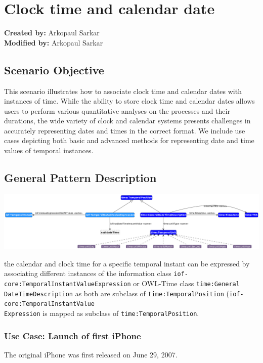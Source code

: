 \section{Clock time and calendar date}
\label{sec-clock-calendar}

\textbf{Created by:} Arkopaul Sarkar \\
\textbf{Modified by:} Arkopaul Sarkar \\

\subsection*{Scenario Objective}

This scenario illustrates how to associate clock time and calendar dates with instances of time. While the ability to store clock time and calendar dates allows users to perform various quantitative analyses on the processes and their durations, the wide variety of clock and calendar systems presents challenges in accurately representing dates and times in the correct format. We include use cases depicting both basic and advanced methods for representing date and time values of temporal instances.


\subsection*{General Pattern Description}

\includegraphics[scale=0.28]{scenarios/clock-time-calendar-date/images/general-clock-calendar.png}

the calendar and clock time for a specific temporal instant can be expressed by associating different instances of the information class \texttt{iof-core:TemporalInstantValueExpression} or OWL-Time class \texttt{time:General\\DateTimeDescription} as both are subclass of \texttt{time:TemporalPosition} (\texttt{iof-core:TemporalInstantValue\\Expression} is mapped as subclass of \texttt{time:TemporalPosition}.  

\subsubsection*{Use Case: Launch of first iPhone} 
The original iPhone was first released on June 29, 2007. 

